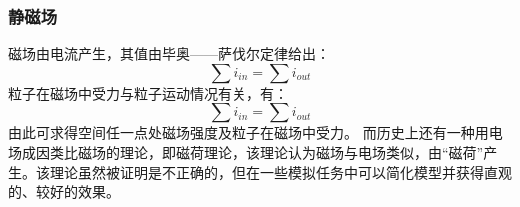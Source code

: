 \documentclass[UTF-8,cs4size]{ctexart}
\begin{document}
\subsubsection{静磁场}
磁场由电流产生，其值由毕奥——萨伐尔定律给出：
\begin{equation}
	\sum i_{in} = \sum i_{out}
\end{equation}
粒子在磁场中受力与粒子运动情况有关，有：
\begin{equation}
	\sum i_{in} = \sum i_{out}
\end{equation}
由此可求得空间任一点处磁场强度及粒子在磁场中受力。
而历史上还有一种用电场成因类比磁场的理论，即磁荷理论，该理论认为磁场与电场类似，由“磁荷”产生。该理论虽然被证明是不正确的，但在一些模拟任务中可以简化模型并获得直观的、较好的效果。
\end{document}
